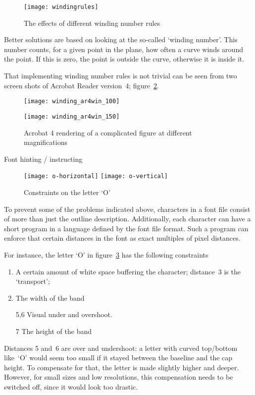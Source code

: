 \begin{figure}[ht]
\texttt{[image: windingrules]}
\caption{The effects of different winding number rules}
\label{fig:winding-number}
\end{figure}
Better solutions are based on looking at the so-called `winding
number'. This number counts, for a given point in the plane, how often
a curve winds around the point. If this is zero, the point is outside
the curve, otherwise it is inside it.

That implementing winding number rules is not trivial can be seen from
two screen shots of Acrobat Reader version~4;
figure~\ref{fig:AR4-winding}.
\begin{figure}
\texttt{[image: winding\_ar4win\_100]}\par
\texttt{[image: winding\_ar4win\_150]}
\caption{Acrobat 4 rendering of a complicated figure at different
  magnifications}
\label{fig:AR4-winding}
\end{figure}

 {Font hinting / instructing}

\begin{figure}[ht]
\texttt{[image: o-horizontal]}
\texttt{[image: o-vertical]}
\caption{Constraints on the letter `O'}
\label{fig:o-constraints}
\end{figure}
To prevent some of the problems indicated above, characters in a font
file consist of more than just the outline description. Additionally,
each character can have a short program in a language defined by the
font file format. Such a program can enforce that certain distances
in the font as exact multiples of pixel distances.

For instance, the letter `O' in figure~\ref{fig:o-constraints} has the
following constraints
\begin{enumerate}
\item A certain amount of white space buffering the character;
  distance~3 is the `transport';
\item The width of the band
\item[5,6] Visual under and overshoot.
\item[7] The height of the band
\end{enumerate}
Distances 5 and~6 are over and undershoot: a letter with curved
top/bottom like~`O' would seem too small if it stayed between the
baseline and the cap height. To compensate for that, the letter is
made slightly higher and deeper. However, for small sizes and low
resolutions, this compensation needs to be switched off, since it
would look too drastic.

